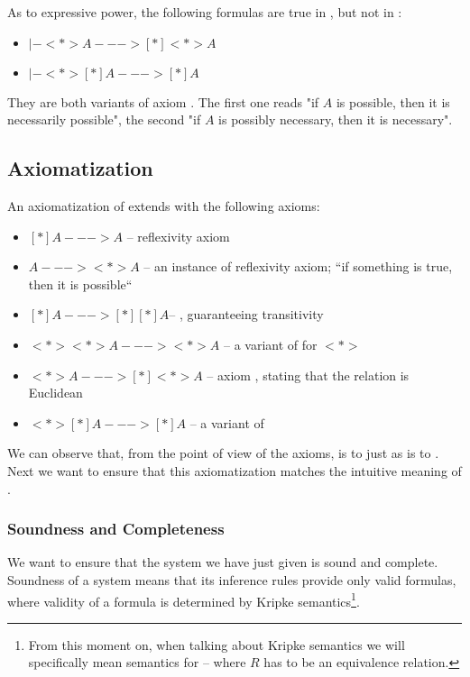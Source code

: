 As to expressive power, the following formulas are true in \logic{}, but not in \logiciSfour:
\begin{itemize}
\item[] $ |- <*> A ---> [*]<*> A$
\item[]$ |- <*>[*]A ---> [*]A$
\end{itemize}
They are both variants of axiom \axiomSfive{}. The first one reads "if $A$ is possible, then it is necessarily possible", the second "if $A$ is possibly necessary, then it is necessary".

\subsection {Axiomatization}
An axiomatization of \logic{} extends \logiciK{} with the following axioms:
\begin{itemize}
\item[] $[*]A ---> A$ -- reflexivity axiom \axiomT{}
\item[] $A ---> <*>A$ -- an instance of reflexivity axiom; ``if something is true, then it is possible``
\item[] $[*]A ---> [*][*]A$-- \axiomSfour{}, guaranteeing transitivity
\item[] $<*><*>A ---> <*>A$ -- a variant of \axiomSfour{} for $<*>$
\item[] $<*>A ---> [*]<*>A$ -- axiom \axiomSfive{}, stating that the relation is Euclidean
\item[] $<*>[*]A ---> [*]A$ -- a variant of \axiomSfive{}
\end{itemize}

We can observe that, from the point of view of the axioms, \logiciSfive{} is to \logicSfive{} just as \logiciK{} is to \logicK{}. Next we want to ensure that this axiomatization matches the intuitive meaning of \logic{}.

\subsubsection{Soundness and Completeness}
We want to ensure that the system we have just given is sound and complete. Soundness of a system means that its inference rules provide only valid formulas, where validity of a formula is determined by Kripke semantics\footnote{From this moment on, when talking about Kripke semantics we will specifically mean semantics for \logic{} -- where $R$ has to be an equivalence relation.}.

